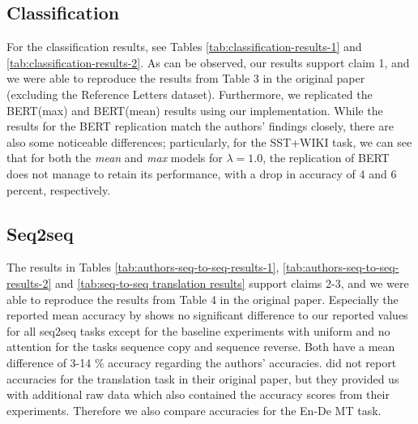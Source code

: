 
\subsection{Classification}
For the classification results, see Tables \ref{tab:classification-results-1} and \ref{tab:classification-results-2}. As can be observed, our results support claim 1, and we were able to reproduce the results from Table 3 in the original paper (excluding the Reference Letters dataset). Furthermore, we replicated the BERT(max) and BERT(mean) results using our implementation. While the results for the BERT replication match the authors' findings closely, there are also some noticeable differences; particularly, for the SST+WIKI task, we can see that for both the \textit{mean} and \textit{max} models for $\lambda = 1.0$, the replication of BERT does not manage to retain its performance, with a drop in accuracy of 4 and 6 percent, respectively.

\subsection{Seq2seq}
The results in Tables \ref{tab:authors-seq-to-seq-results-1}, \ref{tab:authors-seq-to-seq-results-2} and \ref{tab:seq-to-seq translation results} support claims 2-3, and we were able to reproduce the results from Table 4 in the original paper. Especially the reported mean accuracy by \cite{pruthi-etal-2020-learning} shows no significant difference to our reported values for all seq2seq tasks except for the baseline experiments with uniform and no attention for the tasks sequence copy and sequence reverse. Both have a mean difference of 3-14 \% accuracy regarding the authors' accuracies. \citet{pruthi-etal-2020-learning} did not report accuracies for the translation task in their original paper, but they provided us with additional raw data which also contained the accuracy scores from their experiments. Therefore we also compare accuracies for the En-De MT task.

